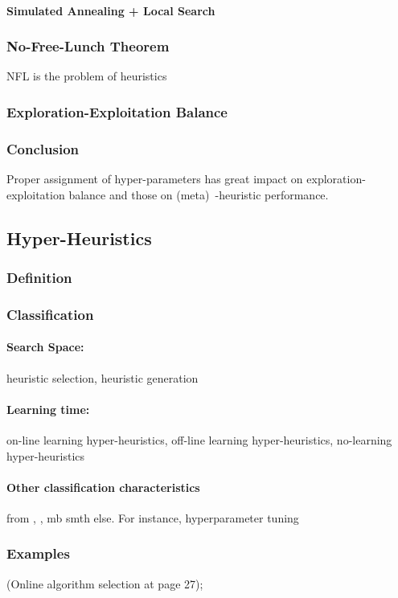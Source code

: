 \paragraph{Simulated Annealing + Local Search} \cite{martin1996combining}

\subsubsection{No-Free-Lunch Theorem}
NFL is the problem of heuristics\cite{wolpert1997no}
\subsubsection{Exploration-Exploitation Balance}
\subsubsection{Conclusion} 
Proper assignment of hyper-parameters has great impact on exploration-exploitation balance and those on (meta)~-heuristic performance. 

\subsection{Hyper-Heuristics}
\subsubsection{Definition}
\subsubsection{Classification}
\paragraph{Search Space:} heuristic selection, heuristic generation
\paragraph{Learning time:} on-line learning hyper-heuristics, off-line learning hyper-heuristics, no-learning hyper-heuristics
\paragraph{Other classification characteristics} from \cite{surv:kerschke2019automated}, \cite{burke2019classification}, mb smth else. For instance, hyperparameter tuning
\subsubsection{Examples}\label{bg: hh examples}%
\cite{surv:drake2019recent} (Online algorithm selection at page 27); \cite{surv:kerschke2019automated}

